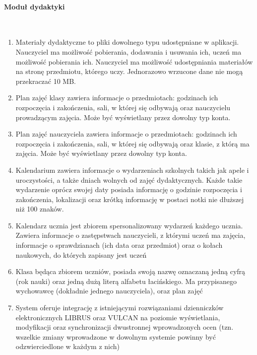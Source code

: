 \documentclass{article}
\begin{document}
\paragraph{Moduł dydaktyki} \mbox{}\\
\begin{enumerate}
	\item Materiały dydaktyczne to pliki dowolnego typu udostępniane w aplikacji. Nauczyciel ma możliwość pobierania, dodawania i usuwania ich, uczeń ma możliwość pobierania ich. Nauczyciel ma możliwość udostępniania materiałów na stronę przedmiotu, którego uczy. Jednorazowo wrzucone dane nie mogą przekraczać 10 MB.
    \item Plan zajęć klasy zawiera informacje o przedmiotach: godzinach ich rozpoczęcia i zakończenia, sali, w której się odbywają oraz nauczycielu prowadzącym zajęcia. Może być wyświetlany przez dowolny typ konta.
    \item Plan zajęć nauczyciela zawiera informacje o przedmiotach: godzinach ich rozpoczęcia i zakończenia, sali, w której się odbywają oraz klasie, z którą ma zajęcia. Może być wyświetlany przez dowolny typ konta.
    \item Kalendarium zawiera informacje o wydarzeniach szkolnych takich jak apele i uroczystości, a także dniach wolnych od zajęć dydaktycznych. Każde takie wydarzenie oprócz swojej daty posiada informację o godzinie rozpoczęcia i zakończenia, lokalizacji oraz krótką informację w postaci notki nie dłuższej niż 100 znaków.
    \item Kalendarz ucznia jest zbiorem spersonalizowany wydarzeń każdego ucznia. Zawiera informacje o zastępstwach nauczycieli, z którymi uczeń ma zajęcia, informacje o sprawdzianach (ich data oraz przedmiot) oraz o kołach naukowych, do których zapisany jest uczeń
    \item Klasa będąca zbiorem uczniów, posiada swoją nazwę oznaczaną jedną cyfrą (rok nauki) oraz jedną dużą literą alfabetu łacińskiego. Ma przypisanego wychowawcę (dokładnie jednego nauczyciela), oraz plan zajęć
    \item System oferuje integrację z istniejącymi rozwiązaniami dzienniczków elektronicznych LIBRUS oraz VULCAN na poziomie wyświetlania, modyfikacji oraz synchronizacji dwustronnej wprowadzonych ocen (tzn. wszelkie zmiany wprowadzone w dowolnym systemie powinny być odzwierciedlone w każdym z nich)
\end{enumerate}
\end{document}
